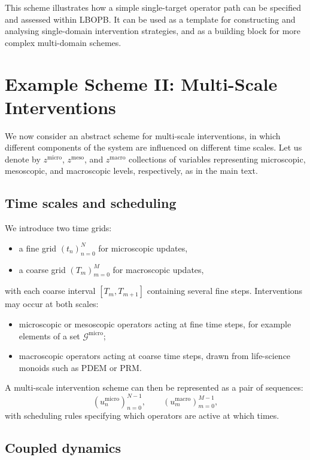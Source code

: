 \documentclass[11pt]{book}
\theoremstyle{plain}
\theoremstyle{definition}
\theoremstyle{remark}
\begin{document}
This scheme illustrates how a simple single-target operator path can
be specified and assessed within LBOPB. It can be used as a template
for constructing and analysing single-domain intervention strategies,
and as a building block for more complex multi-domain schemes.

\section{Example Scheme II: Multi-Scale Interventions}


We now consider an abstract scheme for multi-scale interventions, in
which different components of the system are influenced on different
time scales. Let us denote by $z^{\mathrm{micro}}$, $z^{\mathrm{meso}}$,
and $z^{\mathrm{macro}}$ collections of variables representing
microscopic, mesoscopic, and macroscopic levels, respectively, as in
the main text.

\subsection*{Time scales and scheduling}

We introduce two time grids:

\begin{itemize}
  \item a fine grid $(t_{n})_{n=0}^{N}$ for microscopic updates,
  \item a coarse grid $(T_{m})_{m=0}^{M}$ for macroscopic updates,
\end{itemize}
with each coarse interval $[T_{m}, T_{m+1}]$ containing several fine
steps. Interventions may occur at both scales:

\begin{itemize}
  \item microscopic or mesoscopic operators acting at fine time steps,
        for example elements of a set
        $\mathcal{G}^{\mathrm{micro}}$;
  \item macroscopic operators acting at coarse time steps, drawn from
        life-science monoids such as PDEM or PRM.
\end{itemize}

A multi-scale intervention scheme can then be represented as a pair of
sequences:
\[
  (u^{\mathrm{micro}}_{n})_{n=0}^{N-1},
  \qquad
  (u^{\mathrm{macro}}_{m})_{m=0}^{M-1},
\]
with scheduling rules specifying which operators are active at which
times.

\subsection*{Coupled dynamics}
\end{document}
